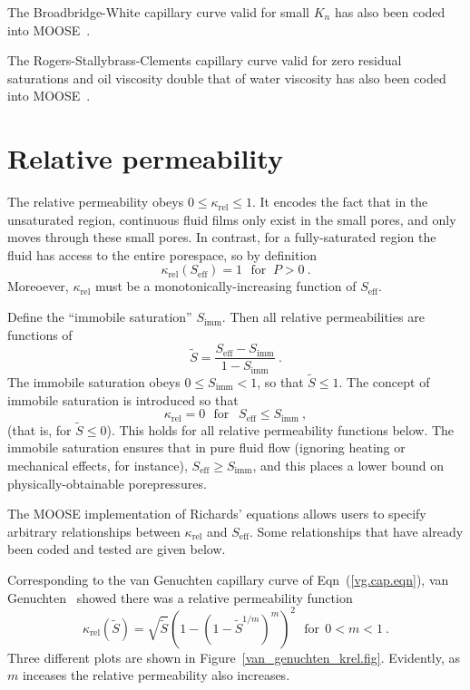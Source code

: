 \documentclass[]{scrreprt}
\begin{document}
The Broadbridge-White capillary curve valid for small $K_{n}$ has also been coded into MOOSE~\cite{bw1988}.

The Rogers-Stallybrass-Clements capillary curve valid for zero
residual saturations and oil viscosity double that of water viscosity
has also been coded into MOOSE~\cite{rsc1983}.

\section{Relative permeability}
\label{rel.perm.sec}

The relative permeability obeys $0\leq \kappa_{\mathrm{rel}} \leq 1$.
It encodes the fact that in the unsaturated region, continuous fluid
films only exist in the small pores, and only moves through these
small pores.  In contrast, for a fully-saturated region the fluid has
access to the entire porespace, so by definition
\begin{equation}
\kappa_{\mathrm{rel}}(S_{\mathrm{eff}}) = 1 \ \ \ \mbox{for }\  P>0
\ .
\label{full.sat.rel.perm.eqn}
\end{equation}
Moreoever, $\kappa_{\mathrm{rel}}$ must be a monotonically-increasing
function of $S_{\mathrm{eff}}$.

Define the ``immobile saturation'' $S_{\mathrm{imm}}$.  Then all
relative permeabilities are functions of
\begin{equation}
\tilde{S} = \frac{S_{\mathrm{eff}} -
  S_{\mathrm{imm}}}{1 - S_{\mathrm{imm}}} \ .
\end{equation}
The immobile saturation obeys $0\leq S_{\mathrm{imm}} < 1$, so that
$\tilde{S} \leq 1$.  The concept of immobile saturation
is introduced so that
\begin{equation}
\kappa_{\mathrm{rel}} = 0 \ \ \ \mbox{for }\ \ S_{\mathrm{eff}} \leq
S_{\mathrm{imm}} \ ,
\end{equation}
(that is, for $\tilde{S}\leq 0$).
This holds for all relative permeability functions below.  The
immobile saturation ensures that in pure fluid flow (ignoring heating
or mechanical effects, for instance), $S_{\mathrm{eff}}\geq
S_{\mathrm{imm}}$, and this places a lower bound on
physically-obtainable porepressures.

The MOOSE implementation of Richards' equations allows users to
specify arbitrary relationships between $\kappa_{\mathrm{rel}}$ and
$S_{\mathrm{eff}}$.  Some relationships that have already been coded
and tested are given below.

Corresponding to the van Genuchten capillary curve of
Eqn~(\ref{vg.cap.eqn}), van Genuchten~\cite{vangenucthen1980} showed
there was a relative permeability function
\begin{equation}
\kappa_{\mathrm{rel}}(\tilde{S}) = \sqrt{\tilde{S}} \left( 1- \left(1 -
\tilde{S}^{1/m}\right)^{m} \right)^{2}
 \ \ \ \mbox{for}\ \ 0<m<1 \ .
\label{vg.krel.eqn}
\end{equation}
Three different plots are shown in
Figure~\ref{van_genuchten_krel.fig}.  Evidently, as $m$ inceases the
relative permeability also increases.
\end{document}
